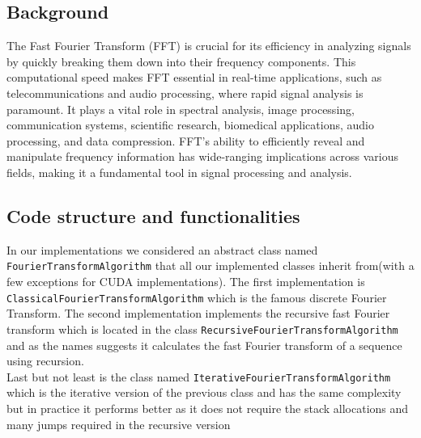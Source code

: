 \subsection{Background}
The Fast Fourier Transform (FFT) is crucial for its efficiency in analyzing signals by quickly breaking them down into their frequency components. This computational speed makes FFT essential in real-time applications, such as telecommunications and audio processing, where rapid signal analysis is paramount. It plays a vital role in spectral analysis, image processing, communication systems, scientific research, biomedical applications, audio processing, and data compression. FFT's ability to efficiently reveal and manipulate frequency information has wide-ranging implications across various fields, making it a fundamental tool in signal processing and analysis.

\subsection{Code structure and functionalities}
In our implementations we considered an abstract class named \\\texttt{FourierTransformAlgorithm} that all our implemented classes inherit from(with a few exceptions for CUDA implementations). The first implementation is \texttt{ClassicalFourierTransformAlgorithm} which is the famous discrete Fourier Transform. The second implementation implements the recursive fast Fourier transform which is located in the class \texttt{RecursiveFourierTransformAlgorithm} and as the names suggests it calculates the fast Fourier transform of a sequence using recursion. \\Last but not least is the class named \texttt{IterativeFourierTransformAlgorithm} which is the iterative version of the previous class and has the same complexity but in practice it performs better as it does not require the stack allocations and many jumps required in the recursive version

